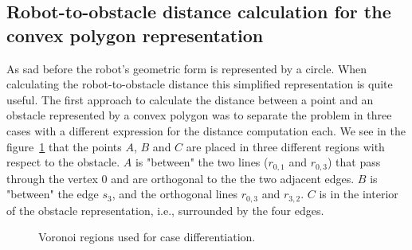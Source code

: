 \subsection{Robot-to-obstacle distance calculation for the convex polygon representation}

As sad before the robot's geometric form is represented by a circle.
When calculating the robot-to-obstacle distance this simplified representation is quite useful. 
The first approach to calculate the distance between a point and an obstacle represented by a convex polygon
was to separate the problem in three cases with a different expression for the distance computation each.
We see in the figure~\ref{fig:convexpolygon} that the points $A$, $B$ and $C$ are placed in three different
regions with respect to the obstacle. $A$ is "between" the two lines ($r_{0,1}$ and $r_{0,3}$) that pass through
the vertex $0$ and are orthogonal to the the two adjacent edges. $B$ is "between" the edge $s_{3}$, and the
orthogonal lines $r_{0,3}$ and $r_{3,2}$. $C$ is in the interior of the obstacle representation, i.e., surrounded by the four edges.

\begin{figure}[!h]
\centering
{

}
\caption{Voronoi regions used for case differentiation. \label{fig:convexpolygon}}
\end{figure}

